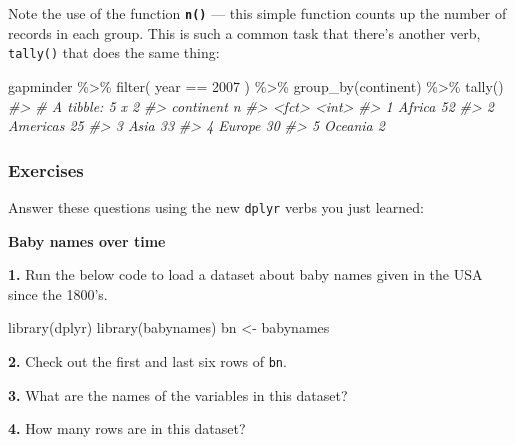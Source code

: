 \documentclass[
]{book}
\newenvironment{Shaded}{\begin{snugshade}}{\end{snugshade}}
\newcommand{\CommentTok}[1]{\textcolor[rgb]{0.56,0.35,0.01}{\textit{#1}}}
\newcommand{\DecValTok}[1]{\textcolor[rgb]{0.00,0.00,0.81}{#1}}
\newcommand{\FunctionTok}[1]{\textcolor[rgb]{0.00,0.00,0.00}{#1}}
\newcommand{\NormalTok}[1]{#1}
\newcommand{\OtherTok}[1]{\textcolor[rgb]{0.56,0.35,0.01}{#1}}
\newcommand{\SpecialCharTok}[1]{\textcolor[rgb]{0.00,0.00,0.00}{#1}}
\begin{document}
Note the use of the function \textbf{\texttt{n()}} --- this simple function counts up the number of records in each group. This is such a common task that there's another verb, \texttt{tally()} that does the same thing:

\begin{Shaded}
\begin{Highlighting}[]
\NormalTok{gapminder }\SpecialCharTok{\%\textgreater{}\%} 
  \FunctionTok{filter}\NormalTok{( year }\SpecialCharTok{==} \DecValTok{2007}\NormalTok{ ) }\SpecialCharTok{\%\textgreater{}\%}
  \FunctionTok{group\_by}\NormalTok{(continent) }\SpecialCharTok{\%\textgreater{}\%} 
  \FunctionTok{tally}\NormalTok{()}
\CommentTok{\#\textgreater{} \# A tibble: 5 x 2}
\CommentTok{\#\textgreater{}   continent     n}
\CommentTok{\#\textgreater{}   \textless{}fct\textgreater{}     \textless{}int\textgreater{}}
\CommentTok{\#\textgreater{} 1 Africa       52}
\CommentTok{\#\textgreater{} 2 Americas     25}
\CommentTok{\#\textgreater{} 3 Asia         33}
\CommentTok{\#\textgreater{} 4 Europe       30}
\CommentTok{\#\textgreater{} 5 Oceania       2}
\end{Highlighting}
\end{Shaded}

\hypertarget{exercises-6}{%
\subsubsection*{Exercises}\label{exercises-6}}

Answer these questions using the new \texttt{dplyr} verbs you just learned:

\textbf{Baby names over time}

\textbf{1.} Run the below code to load a dataset about baby names given in the USA since the 1800's.

\begin{Shaded}
\begin{Highlighting}[]
\FunctionTok{library}\NormalTok{(dplyr)}
\FunctionTok{library}\NormalTok{(babynames)}
\NormalTok{bn }\OtherTok{\textless{}{-}}\NormalTok{ babynames}
\end{Highlighting}
\end{Shaded}

\textbf{2.} Check out the first and last six rows of \texttt{bn}.

\textbf{3.} What are the names of the variables in this dataset?

\textbf{4.} How many rows are in this dataset?
\end{document}
